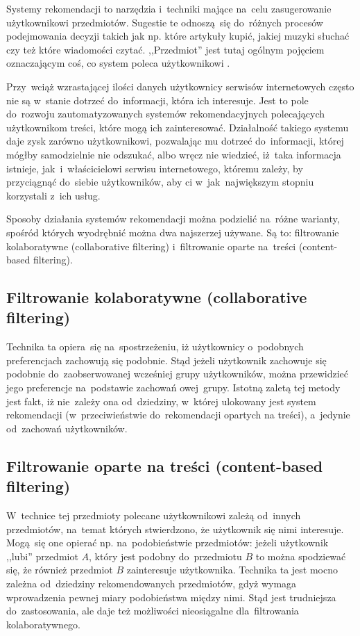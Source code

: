\documentclass[pl]{minipw} %
\begin{document}
Systemy rekomendacji to narzędzia i~techniki mające na~celu zasugerowanie użytkownikowi przedmiotów. Sugestie te odnoszą~się do~różnych procesów podejmowania decyzji takich jak np. które artykuły kupić, jakiej muzyki słuchać czy też które wiadomości czytać. ,,Przedmiot'' jest tutaj ogólnym pojęciem oznaczającym coś, co system poleca użytkownikowi \cite{handbook}. 

Przy~wciąż wzrastającej ilości danych użytkownicy serwisów internetowych często nie są w~stanie dotrzeć do~informacji, która ich interesuje. Jest to pole do~rozwoju zautomatyzowanych systemów rekomendacyjnych polecających użytkownikom treści, które mogą ich zainteresować. Działalność takiego systemu daje zysk zarówno użytkownikowi, pozwalając mu dotrzeć do~informacji, której mógłby samodzielnie nie odszukać, albo wręcz nie wiedzieć, iż~taka informacja istnieje, jak~i~właścicielowi serwisu internetowego, któremu zależy, by przyciągnąć do~siebie użytkowników, aby ci w~jak~największym stopniu korzystali z~ich usług.

Sposoby działania systemów rekomendacji można podzielić na~różne warianty, spośród których wyodrębnić można dwa najszerzej używane. Są to: filtrowanie kolaboratywne (collaborative filtering) i~filtrowanie oparte na~treści (content-based filtering).

\subsection{Filtrowanie kolaboratywne (collaborative filtering)}
Technika ta opiera~się na~spostrzeżeniu, iż użytkownicy o~podobnych preferencjach zachowują się podobnie. Stąd jeżeli użytkownik zachowuje się podobnie do~zaobserwowanej wcześniej grupy użytkowników, można przewidzieć jego preferencje na~podstawie zachowań owej~grupy. Istotną zaletą tej metody jest fakt, iż nie~zależy ona od~dziedziny, w~której ulokowany jest system rekomendacji (w~przeciwieństwie do~rekomendacji opartych na treści), a~jedynie od~zachowań użytkowników.
\subsection{Filtrowanie oparte na treści (content-based filtering)}
W~technice tej przedmioty polecane użytkownikowi zależą od~innych przedmiotów, na~temat których stwierdzono, że użytkownik się nimi interesuje. Mogą~się one opierać np. na~podobieństwie przedmiotów: jeżeli użytkownik ,,lubi'' przedmiot $A$, który jest podobny do~przedmiotu $B$ to można spodziewać się, że również przedmiot $B$ zainteresuje użytkownika. Technika ta jest mocno zależna od~dziedziny rekomendowanych przedmiotów, gdyż wymaga wprowadzenia pewnej miary podobieństwa między nimi. Stąd jest trudniejsza do~zastosowania, ale daje też możliwości nieosiągalne dla~filtrowania kolaboratywnego.
\end{document}
